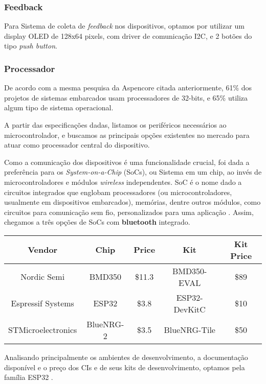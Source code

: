 \documentclass[../monografia.tex]{subfiles}
\begin{document}
\subsubsection{Feedback}

Para Sistema de coleta de \textit{feedback} nos dispositivos, optamos por utilizar um display OLED\cite{oled} de 128x64 pixels, com driver de comunicação I2C, e 2 botões do tipo \textit{push button}. 

\subsubsection{Processador}

De acordo com a mesma pesquisa da Aspencore citada anteriormente, 61\% dos projetos de sistemas embarcados usam processadores de 32-bits, e 65\% utiliza algum tipo de sistema operacional. 

A partir das especificações dadas, listamos os periféricos necessários ao microcontrolador, e buscamos as principais opções existentes no mercado para atuar como processador central do dispositivo. 

Como a comunicação dos dispositivos é uma funcionalidade crucial, foi dada a preferência para os \textit{System-on-a-Chip} (SoCs), ou Sistema em um chip, ao invés de microcontroladores e módulos \textit{wireless} independentes. SoC é o nome dado a circuitos integrados que englobam processadores (ou microcontroladores, usualmente em dispositivos embarcados), memórias, dentre outros módulos, como circuitos para comunicação sem fio, personalizados para uma aplicação \cite{soc}. Assim, chegamos a três opções de SoCs com \textbf{bluetooth} integrado. 


\begin{center}
\begin{tabular}{|c|c|c|c|c|} 
\hline
\textbf{Vendor} & \textbf{Chip} & \textbf{Price} & \textbf{Kit} & \textbf{Kit Price} \\
\hline
Nordic Semi & BMD350 & \$11.3 & BMD350-EVAL & \$89 \\ 
Espressif Systems & ESP32 & \$3.8 & ESP32-DevKitC & \$10 \\ 
STMicroelectronics & BlueNRG-2 & \$3.5 & BlueNRG-Tile & \$50 \\ 
\hline
\end{tabular}
\end{center}

Analisando principalmente os ambientes de desenvolvimento, a documentação disponível e o preço dos CIs e de seus kits de desenvolvimento, optamos pela família ESP32 \cite{ESP32}. 
\end{document}
